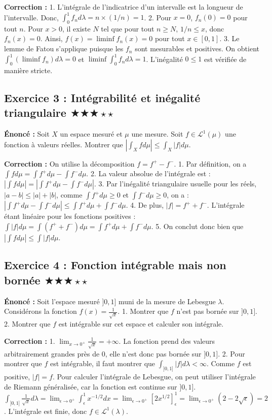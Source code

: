 \documentclass[11pt,a4paper]{article}
\begin{document}
\textbf{Correction :}
1. L'intégrale de l'indicatrice d'un intervalle est la longueur de l'intervalle. Donc, $\int_{0}^{1} f_n d\lambda = n \times (1/n) = 1$.
2. Pour $x=0$, $f_n(0) = 0$ pour tout $n$. Pour $x > 0$, il existe $N$ tel que pour tout $n \ge N$, $1/n \le x$, donc $f_n(x) = 0$. Ainsi, $f(x) = \liminf f_n(x) = 0$ pour tout $x \in [0,1]$.
3. Le lemme de Fatou s'applique puisque les $f_n$ sont mesurables et positives. On obtient $\int_{0}^{1} (\liminf f_n) d\lambda = 0$ et $\liminf \int_{0}^{1} f_n d\lambda = 1$. L'inégalité $0 \le 1$ est vérifiée de manière stricte.


\subsection*{Exercice 3 : Intégrabilité et inégalité triangulaire \quad $\bigstar\bigstar\bigstar\star\star$}
\textbf{Énoncé :}
Soit $X$ un espace mesuré et $\mu$ une mesure. Soit $f \in \mathcal{L}^1(\mu)$ une fonction à valeurs réelles.
Montrer que $\left| \int_X f d\mu \right| \le \int_X |f| d\mu$.

\textbf{Correction :}
On utilise la décomposition $f = f^+ - f^-$.
1. Par définition, on a $\int f d\mu = \int f^+ d\mu - \int f^- d\mu$.
2. La valeur absolue de l'intégrale est :
   $\left| \int f d\mu \right| = \left| \int f^+ d\mu - \int f^- d\mu \right|$.
3. Par l'inégalité triangulaire usuelle pour les réels, $|a - b| \le |a| + |b|$, comme $\int f^+ d\mu \ge 0$ et $\int f^- d\mu \ge 0$, on a :
   $\left| \int f^+ d\mu - \int f^- d\mu \right| \le \int f^+ d\mu + \int f^- d\mu$.
4. De plus, $|f| = f^+ + f^-$. L'intégrale étant linéaire pour les fonctions positives :
   $\int |f| d\mu = \int (f^+ + f^-) d\mu = \int f^+ d\mu + \int f^- d\mu$.
5. On conclut donc bien que $\left| \int f d\mu \right| \le \int |f| d\mu$.


\subsection*{Exercice 4 : Fonction intégrable mais non bornée \quad $\bigstar\bigstar\bigstar\star\star$}
\textbf{Énoncé :}
Soit l'espace mesuré $]0, 1]$ muni de la mesure de Lebesgue $\lambda$.
Considérons la fonction $f(x) = \frac{1}{\sqrt{x}}$.
1. Montrer que $f$ n'est pas bornée sur $]0, 1]$.
2. Montrer que $f$ est intégrable sur cet espace et calculer son intégrale.

\textbf{Correction :}
1. $\lim_{x \to 0^+} \frac{1}{\sqrt{x}} = +\infty$. La fonction prend des valeurs arbitrairement grandes près de 0, elle n'est donc pas bornée sur $]0, 1]$.
2. Pour montrer que $f$ est intégrable, il faut montrer que $\int_{]0,1]} |f| d\lambda < \infty$.
   Comme $f$ est positive, $|f| = f$. Pour calculer l'intégrale de Lebesgue, on peut utiliser l'intégrale de Riemann généralisée, car la fonction est continue sur $]0,1]$.
   $\int_{]0, 1]} \frac{1}{\sqrt{x}} d\lambda = \lim_{\epsilon \to 0^+} \int_{\epsilon}^{1} x^{-1/2} dx = \lim_{\epsilon \to 0^+} [2x^{1/2}]_{\epsilon}^{1} = \lim_{\epsilon \to 0^+} (2 - 2\sqrt{\epsilon}) = 2$.
   L'intégrale est finie, donc $f \in \mathcal{L}^1(\lambda)$.
\end{document}
